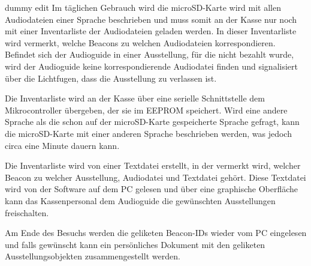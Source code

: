 dummy edit
Im täglichen Gebrauch wird die microSD-Karte wird mit allen Audiodateien einer Sprache beschrieben und muss somit an der Kasse nur noch mit einer Inventarliste der Audiodateien geladen werden.
In dieser Inventarliste wird vermerkt, welche Beacons zu welchen Audiodateien korrespondieren.
Befindet sich der Audioguide in einer Ausstellung, für die nicht bezahlt wurde, wird der Audioguide keine korrespondierende Audiodatei finden und signalisiert über die Lichtfugen, dass die Ausstellung zu verlassen ist.

Die Inventarliste wird an der Kasse über eine serielle Schnittstelle dem Mikrocontroller übergeben, der sie im EEPROM speichert.
Wird eine andere Sprache als die schon auf der microSD-Karte gespeicherte Sprache gefragt, kann die microSD-Karte mit einer anderen Sprache beschrieben werden, was jedoch circa eine Minute dauern kann.

Die Inventarliste wird von einer Textdatei erstellt, in der vermerkt wird, welcher Beacon zu welcher Ausstellung, Audiodatei und Textdatei gehört.
Diese Textdatei wird von der Software auf dem PC gelesen und über eine graphische Oberfläche kann das Kassenpersonal dem Audioguide die gewünschten Ausstellungen freischalten.

Am Ende des Besuchs werden die geliketen Beacon-IDs wieder vom PC eingelesen und falls gewünscht kann ein persönliches Dokument mit den geliketen Ausstellungsobjekten zusammengestellt werden.

